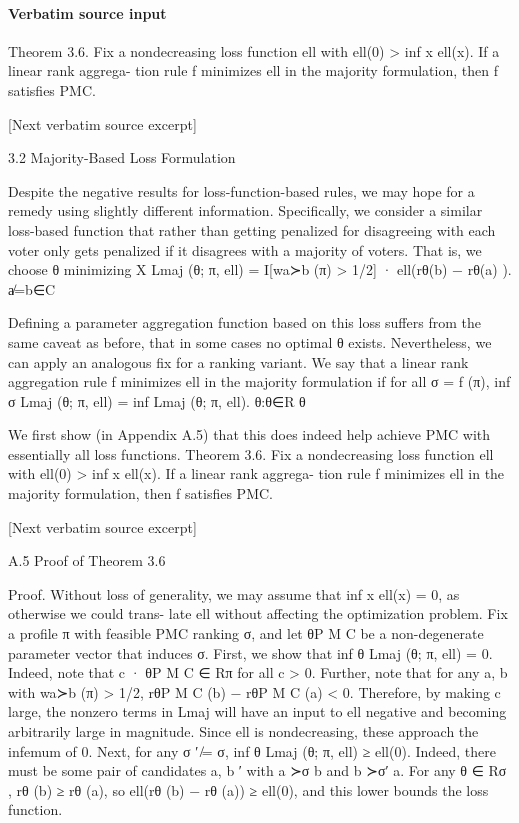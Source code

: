 \documentclass[10pt]{article}
\begin{document}
\paragraph{Verbatim source input}
\begin{ReviewVerbatim}
Theorem 3.6. Fix a nondecreasing loss function ell with ell(0) > inf x ell(x). If a linear rank aggrega-
tion rule f minimizes ell in the majority formulation, then f satisfies PMC.

[Next verbatim source excerpt]

3.2   Majority-Based Loss Formulation

Despite the negative results for loss-function-based rules, we may hope for a remedy using slightly
different information. Specifically, we consider a similar loss-based function that rather than getting
penalized for disagreeing with each voter only gets penalized if it disagrees with a majority of voters.
That is, we choose θ minimizing
                                       X
                    Lmaj (θ; π, ell) =         I[wa≻b (π) > 1/2] · ell(rθ(b) − rθ(a) ).
                                       a̸=b∈C

Defining a parameter aggregation function based on this loss suffers from the same caveat as before,
that in some cases no optimal θ exists. Nevertheless, we can apply an analogous fix for a ranking
variant. We say that a linear rank aggregation rule f minimizes ell in the majority formulation if for
all σ = f (π),
                               inf σ Lmaj (θ; π, ell) = inf Lmaj (θ; π, ell).
                               θ:θ∈R                      θ

We first show (in Appendix A.5) that this does indeed help achieve PMC with essentially all loss
functions.
Theorem 3.6. Fix a nondecreasing loss function ell with ell(0) > inf x ell(x). If a linear rank aggrega-
tion rule f minimizes ell in the majority formulation, then f satisfies PMC.

[Next verbatim source excerpt]

A.5   Proof of Theorem 3.6

Proof. Without loss of generality, we may assume that inf x ell(x) = 0, as otherwise we could trans-
late ell without affecting the optimization problem. Fix a profile π with feasible PMC ranking σ, and
let θP M C be a non-degenerate parameter vector that induces σ.
First, we show that inf θ Lmaj (θ; π, ell) = 0. Indeed, note that c · θP M C ∈ Rπ for all c > 0. Further,
note that for any a, b with wa≻b (π) > 1/2, rθP M C (b) − rθP M C (a) < 0. Therefore, by making c
large, the nonzero terms in Lmaj will have an input to ell negative and becoming arbitrarily large in
magnitude. Since ell is nondecreasing, these approach the infemum of 0.
Next, for any σ ′ ̸= σ, inf θ Lmaj (θ; π, ell) ≥ ell(0). Indeed, there must be some pair of candidates a, b
                                               ′
with a ≻σ b and b ≻σ′ a. For any θ ∈ Rσ , rθ (b) ≥ rθ (a), so ell(rθ (b) − rθ (a)) ≥ ell(0), and this
lower bounds the loss function.
\end{ReviewVerbatim}
\end{document}
